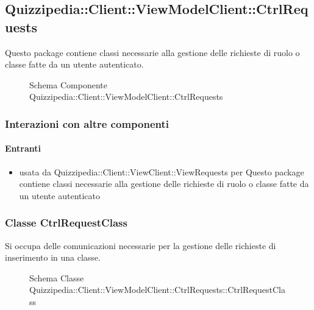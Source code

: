 \subsection{Quizzipedia::Client::ViewModelClient::CtrlRequests}
Questo package contiene classi necessarie alla gestione delle richieste di ruolo o classe fatte da un utente autenticato.
\begin{figure}[H]
\centering
\noindent{}
\caption[Schema Componente Quizzipedia::Client::ViewModelClient::CtrlRequests]{Schema Componente Quizzipedia::Client::ViewModelClient::CtrlRequests}
\end{figure}
\subsubsection{Interazioni con altre componenti}
\paragraph{Entranti}
\begin{itemize}
\item usata da Quizzipedia::Client::ViewClient::ViewRequests per Questo package contiene classi necessarie alla gestione delle richieste di ruolo o classe fatte da un utente autenticato
\end{itemize}
\subsubsection{Classe CtrlRequestClass}
Si occupa delle comunicazioni necessarie per la gestione delle richieste di inserimento in una classe.
\begin{figure}[H]
\centering
\noindent{}
\caption[Schema Classe CtrlRequestClass]{Schema Classe Quizzipedia::Client::ViewModelClient::CtrlRequests::CtrlRequestClass}
\end{figure}
